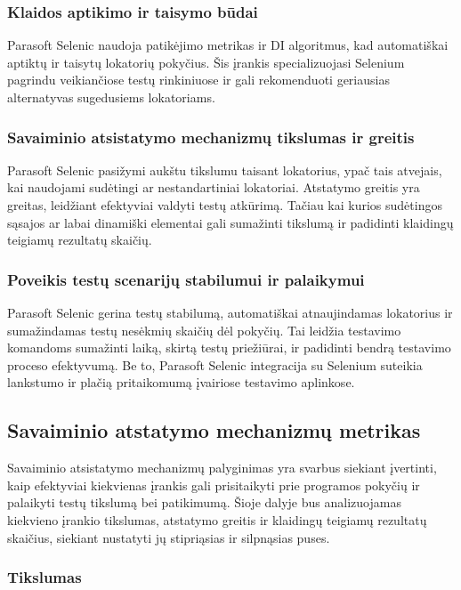 \documentclass[
]{VUMIFPSkursinis}
\begin{document}
\subsubsection{Klaidos aptikimo ir taisymo būdai}

Parasoft Selenic naudoja patikėjimo metrikas ir DI algoritmus, kad automatiškai aptiktų ir taisytų lokatorių pokyčius. Šis įrankis specializuojasi Selenium pagrindu veikiančiose testų rinkiniuose ir gali rekomenduoti geriausias alternatyvas sugedusiems lokatoriams.

\subsubsection{Savaiminio atsistatymo mechanizmų tikslumas ir greitis}

Parasoft Selenic pasižymi aukštu tikslumu taisant lokatorius, ypač tais atvejais, kai naudojami sudėtingi ar nestandartiniai lokatoriai. Atstatymo greitis yra greitas, leidžiant efektyviai valdyti testų atkūrimą. Tačiau kai kurios sudėtingos sąsajos ar labai dinamiški elementai gali sumažinti tikslumą ir padidinti klaidingų teigiamų rezultatų skaičių.

\subsubsection{Poveikis testų scenarijų stabilumui ir palaikymui}

Parasoft Selenic gerina testų stabilumą, automatiškai atnaujindamas lokatorius ir sumažindamas testų nesėkmių skaičių dėl pokyčių. Tai leidžia testavimo komandoms sumažinti laiką, skirtą testų priežiūrai, ir padidinti bendrą testavimo proceso efektyvumą. Be to, Parasoft Selenic integracija su Selenium suteikia lankstumo ir plačią pritaikomumą įvairiose testavimo aplinkose.

\subsection{Savaiminio atstatymo mechanizmų metrikas}

Savaiminio atsistatymo mechanizmų palyginimas yra svarbus siekiant įvertinti, kaip efektyviai kiekvienas įrankis gali prisitaikyti prie programos pokyčių ir palaikyti testų tikslumą bei patikimumą. Šioje dalyje bus analizuojamas kiekvieno įrankio tikslumas, atstatymo greitis ir klaidingų teigiamų rezultatų skaičius, siekiant nustatyti jų stipriąsias ir silpnąsias puses.

\subsubsection{Tikslumas}
\end{document}
